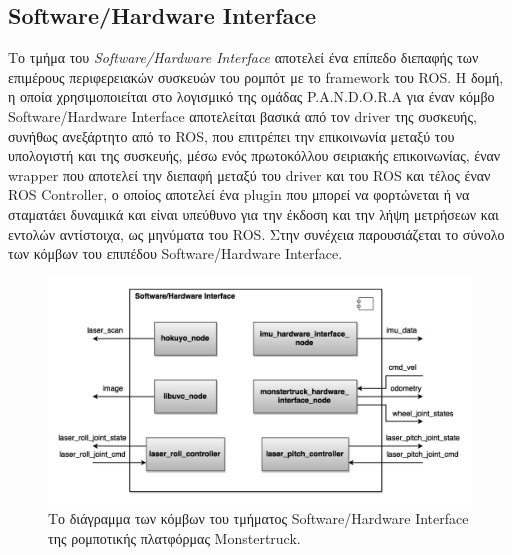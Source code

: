 \subsection{Software/Hardware Interface} \label{ssec:sw_hw_interface_component}
Το τμήμα του \textit{Software/Hardware Interface} αποτελεί ένα επίπεδο διεπαφής των επιμέρους περιφερειακών συσκευών του ρομπότ με το framework του ROS. Η δομή, η οποία χρησιμοποιείται στο λογισμικό της ομάδας P.A.N.D.O.R.A για έναν κόμβο Software/Hardware Interface αποτελείται βασικά από τον driver της συσκευής, συνήθως ανεξάρτητο από το ROS, που επιτρέπει την επικοινωνία μεταξύ του υπολογιστή και της συσκευής, μέσω ενός πρωτοκόλλου  σειριακής επικοινωνίας, έναν wrapper που αποτελεί την διεπαφή μεταξύ του driver και του ROS και τέλος έναν ROS Controller, ο οποίος αποτελεί ένα plugin που μπορεί να φορτώνεται ή να σταματάει δυναμικά και είναι υπεύθυνο για την έκδοση και την λήψη μετρήσεων και εντολών αντίστοιχα, ως μηνύματα του ROS. Στην συνέχεια παρουσιάζεται το σύνολο των κόμβων του επιπέδου Software/Hardware Interface.

\begin{figure}[!ht]
	\centering
	\includegraphics[width=0.8\linewidth]{Chapters/Chapter4/Figures/hardware_component_diagram.png}
	\caption{Το διάγραμμα των κόμβων του τμήματος Software/Hardware Interface της ρομποτικής πλατφόρμας Monstertruck.}
	\label{fig:hardware_component_diagram}
\end{figure}

